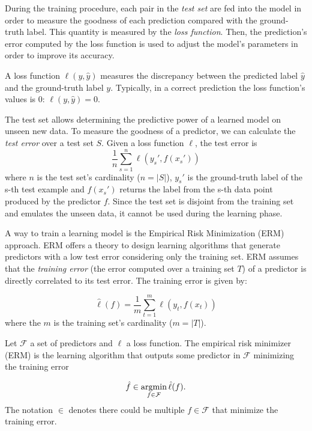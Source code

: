 During the training procedure, each pair in the \textit{test set} are fed into the model in order to measure the goodness of each prediction compared with the ground-truth label. This quantity is measured by the \textit{loss function}. Then, the prediction's error computed by the loss function is used to adjust the model's parameters in order to improve its accuracy. 

\begin{definition}
	A loss function $\ell(y, \hat y)$ measures the discrepancy between the predicted label $\hat y$ and the ground-truth label $y$. Typically, in a correct prediction the loss function's values is $0$: $\ell (y, \hat y) = 0$.
\end{definition}

The test set allows determining the predictive power of a learned model on unseen new data. To measure the goodness of a predictor, we can calculate the \textit{test error} over a test set $S$. Given a loss function $\ell$, the test error is
\begin{equation}
\frac{1}{n} \sum_{s=1}^{n}\ell(y_s', f(x_s'))
\end{equation}
where $n$ is the test set's cardinality ($n = |S|$), $y_s'$ is the ground-truth label of the s-th test example and $f(x_s')$ returns the label from the s-th data point produced by the predictor $f$. Since the test set is disjoint from the training set and emulates the unseen data, it cannot be used during the learning phase.

A way to train a learning model is the Empirical Risk Minimization (ERM) approach. ERM offers a theory to design learning algorithms that generate predictors with a low test error considering only the training set. ERM assumes that the \textit{training error} (the error computed over a training set $T$) of a predictor is directly correlated to its test error. The training error is given by:

\begin{equation}
\hat \ell(f) = \frac{1}{m} \sum_{t=1}^{m}\ell(y_t, f(x_t))
\end{equation}
where the $m$ is the training set's cardinality ($m = |T|$).

\begin{definition} 
	Let $\mathcal{F}$ a set of predictors and $\ell$ a loss function. The empirical risk minimizer (ERM) is the learning algorithm that outputs some predictor in $\mathcal{F}$ minimizing the training error
	
	\begin{equation}
	\hat f \in \operatorname*{argmin}_{f \in \mathcal{F}} \hat \ell(f).
	\end{equation}
	The notation $\in$ denotes there could be multiple $f \in \mathcal{F}$ that minimize the training error.
\end{definition}

